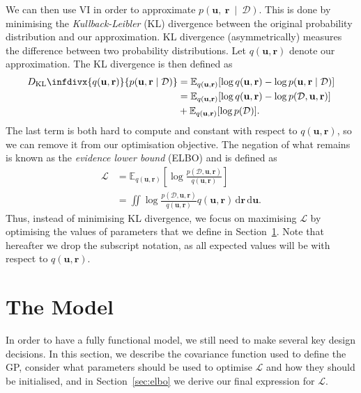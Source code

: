 \documentclass{mpaper}
\newcommand{\DKL}{D_{\mathrm{KL}}\infdivx}
\newcommand{\dx}{\,\mathrm{d}\mathbf{r}\,\mathrm{d}\mathbf{u}}
\newcommand{\pfull}{p(\mathcal{D}, \mathbf{u}, \mathbf{r})}
\newcommand{\approximation}{q(\mathbf{u}, \mathbf{r})}
\newcommand{\posterior}{p(\mathbf{u}, \mathbf{r} \mid \mathcal{D})}
\begin{document}
We can then use VI in order to approximate
$p(\mathbf{u},~\mathbf{r}~\mid~\mathcal{D})$. This is done by minimising the
\emph{Kullback-Leibler} (KL) divergence between the original probability
distribution and our approximation. KL divergence (asymmetrically) measures the
difference between two probability distributions. Let $\approximation$ denote
our approximation. The KL divergence is then defined as
\cite{blei2017variational}
\begin{align*}
  \DKL{\approximation}{\posterior} &= \mathbb{E}_{\approximation}[\log\approximation - \log\posterior ] \\
                                   &= \mathbb{E}_{\approximation}[\log\approximation - \log\pfull] \\
                                   &+ \mathbb{E}_{\approximation}[\log p(\mathcal{D})].
\end{align*}
The last term is both hard to compute and constant with respect to
$\approximation$, so we can remove it from our optimisation objective. The
negation of what remains is known as the \emph{evidence lower bound} (ELBO) and
is defined as \cite{DBLP:books/lib/Bishop07,blei2017variational}
\begin{equation} \label{eq:elbo}
  \begin{split}
    \mathcal{L} &= \mathbb{E}_{\approximation}\left[ \log \frac{\pfull}{\approximation} \right] \\
    &= \iint \log \frac{\pfull}{\approximation} \approximation\dx.
  \end{split}
\end{equation}
Thus, instead of minimising KL divergence, we focus on maximising $\mathcal{L}$
by optimising the values of parameters that we define in
Section~\ref{sec:model}. Note that hereafter we drop the subscript notation, as
all expected values will be with respect to $\approximation$.

\section{The Model} \label{sec:model}

In order to have a fully functional model, we still need to make several key
design decisions. In this section, we describe the covariance function used to
define the GP, consider what parameters should be used to optimise $\mathcal{L}$
and how they should be initialised, and in Section~\ref{sec:elbo} we derive our
final expression for $\mathcal{L}$.
\end{document}
